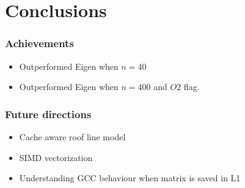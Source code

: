 \documentclass{beamer}
\begin{document}
\section{Conclusions}

\begin{frame}
\frametitle{Achievements}
\begin{itemize}
 \item Outperformed Eigen when $n = 40$
 \item Outperformed Eigen when $n = 400$ and $O2$ flag.
\end{itemize}
 \end{frame}
 
\begin{frame}
\frametitle{Future directions}

\begin{itemize}
 \item Cache aware roof line model
 \item SIMD vectorization
 \item Understanding GCC behaviour when matrix is saved in L1
\end{itemize}
\end{frame}
\end{document}
